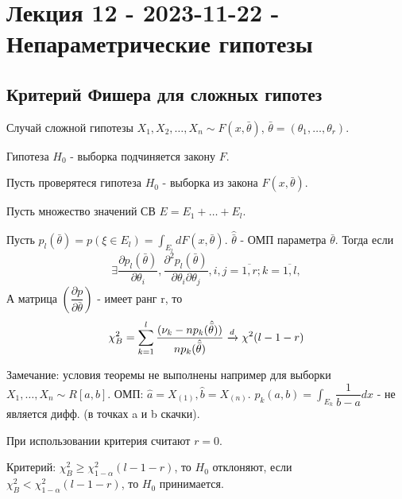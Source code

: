 \section{Лекция 12 - 2023-11-22 - Непараметрические гипотезы}

\subsection{Критерий Фишера для сложных гипотез}

\begin{ex}
  Случай сложной гипотезы
  $X_1, X_2, \dots, X_n \sim F(x, \bar \theta)$, $\bar\theta = (\theta_1, \dots, \theta_r)$.

  Гипотеза $H_0$ - выборка подчиняется закону $F$.
\end{ex}

\begin{theorem}
  Пусть проверятеся гипотеза $H_0$ - выборка из закона $F(x, \bar\theta)$.
  
  Пусть множество значений СВ $E = E_1 + \dots + E_l$.
  
  Пусть $p_l (\bar\theta) = p(\xi \in E_l) = \int_{E_l} dF(x, \bar\theta)$. 
  $\hat{\bar\theta}$ - ОМП параметра $\bar\theta$.
  Тогда если
  \[
    \exists \dfrac{\partial p_l(\bar\theta)}{\partial \theta_i}, \dfrac{\partial^2 p_l(\bar\theta)}{\partial \theta_i \partial \theta_j}, i, j = \overline{1, r}; k=\overline{1, l},
  \]
  А матрица $\left(\dfrac{\partial p}{\partial \bar\theta}\right)$ - имеет ранг r, то
  \[
    \chi^2_B = \sum_{k=1}^l \dfrac{(\nu_k - np_k(\hat{\bar\theta}))}{np_k(\hat{\bar\theta})} \xrightarrow[]{d} \chi^2 (l-1-r)
  \]
\end{theorem}

Замечание: условия теоремы не выполнены например для выборки $X_1, \dots, X_n \sim R[a, b]$.
ОМП: $\hat a = X_{(1)}, \hat b = X_{(n)}$. $p_k (a, b) = \int_{E_k} \dfrac{1}{b-a} dx$ - не является дифф. (в точках a и b скачки).

При использовании критерия считают $r = 0$.

Критерий: $\chi^2_B \geqslant \chi^2_{1-\alpha} (l-1-r)$, то $H_0$ отклоняют, если $\chi^2_B < \chi^2_{1-\alpha} (l-1-r)$, то $H_0$ принимается.

